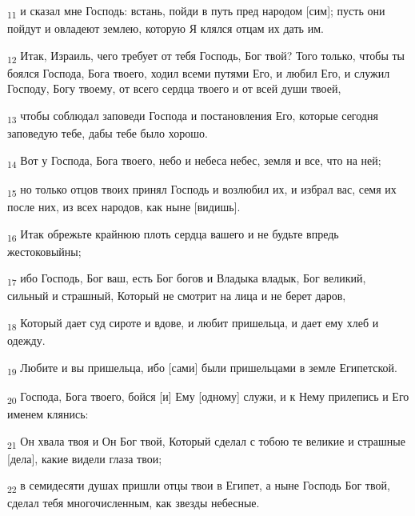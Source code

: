 \begin{tcolorbox}
\textsubscript{11} и сказал мне Господь: встань, пойди в путь пред народом [сим]; пусть они пойдут и овладеют землею, которую Я клялся отцам их дать им.
\end{tcolorbox}
\begin{tcolorbox}
\textsubscript{12} Итак, Израиль, чего требует от тебя Господь, Бог твой? Того только, чтобы ты боялся Господа, Бога твоего, ходил всеми путями Его, и любил Его, и служил Господу, Богу твоему, от всего сердца твоего и от всей души твоей,
\end{tcolorbox}
\begin{tcolorbox}
\textsubscript{13} чтобы соблюдал заповеди Господа и постановления Его, которые сегодня заповедую тебе, дабы тебе было хорошо.
\end{tcolorbox}
\begin{tcolorbox}
\textsubscript{14} Вот у Господа, Бога твоего, небо и небеса небес, земля и все, что на ней;
\end{tcolorbox}
\begin{tcolorbox}
\textsubscript{15} но только отцов твоих принял Господь и возлюбил их, и избрал вас, семя их после них, из всех народов, как ныне [видишь].
\end{tcolorbox}
\begin{tcolorbox}
\textsubscript{16} Итак обрежьте крайнюю плоть сердца вашего и не будьте впредь жестоковыйны;
\end{tcolorbox}
\begin{tcolorbox}
\textsubscript{17} ибо Господь, Бог ваш, есть Бог богов и Владыка владык, Бог великий, сильный и страшный, Который не смотрит на лица и не берет даров,
\end{tcolorbox}
\begin{tcolorbox}
\textsubscript{18} Который дает суд сироте и вдове, и любит пришельца, и дает ему хлеб и одежду.
\end{tcolorbox}
\begin{tcolorbox}
\textsubscript{19} Любите и вы пришельца, ибо [сами] были пришельцами в земле Египетской.
\end{tcolorbox}
\begin{tcolorbox}
\textsubscript{20} Господа, Бога твоего, бойся [и] Ему [одному] служи, и к Нему прилепись и Его именем клянись:
\end{tcolorbox}
\begin{tcolorbox}
\textsubscript{21} Он хвала твоя и Он Бог твой, Который сделал с тобою те великие и страшные [дела], какие видели глаза твои;
\end{tcolorbox}
\begin{tcolorbox}
\textsubscript{22} в семидесяти душах пришли отцы твои в Египет, а ныне Господь Бог твой, сделал тебя многочисленным, как звезды небесные.
\end{tcolorbox}
